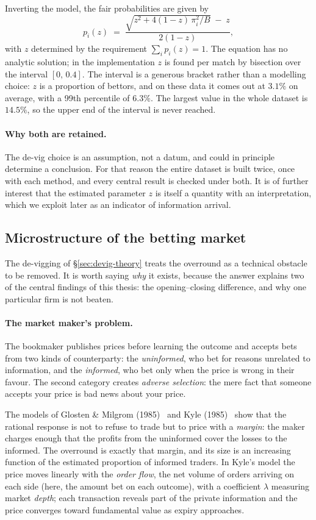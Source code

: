 \documentclass[12pt,a4paper,oneside]{report}
\renewcommand{\_}{\oldunderscore\allowbreak}
\theoremstyle{definition}
\theoremstyle{plain}
\theoremstyle{definition}   %
\begin{document}
Inverting the model, the fair probabilities are given by
\[
p_i(z) \;=\; \frac{\sqrt{z^2 + 4(1-z)\,\pi_i^2/B} \;-\; z}{2(1-z)},
\]
with $z$ determined by the requirement $\sum_i p_i(z) = 1$. The equation has no analytic
solution; in the implementation $z$ is found per match by bisection over the interval
$[0,\,0.4]$. The interval is a generous bracket rather than a modelling choice: $z$ is a
proportion of bettors, and on these data it comes out at $3.1\%$ on average, with a 99th percentile
of $6.3\%$. The largest value in the whole dataset is $14.5\%$, so the upper end of the interval
is never reached.

\paragraph{Why both are retained.} The de-vig choice is an assumption, not a datum, and could
in principle determine a conclusion. For that reason the entire dataset is built twice, once
with each method, and every central result is checked under both. It is of further interest
that the estimated parameter $z$ is itself a quantity with an interpretation, which we exploit
later as an indicator of information arrival.

\subsection{Microstructure of the betting market}
\label{sec:microstructure-theory}

The de-vigging of \S\ref{sec:devig-theory} treats the overround as a technical obstacle to be
removed. It is worth saying \emph{why} it exists, because the answer explains two of the
central findings of this thesis: the opening--closing difference, and why one particular firm
is not beaten.

\paragraph{The market maker's problem.} The bookmaker publishes prices before learning the
outcome and accepts bets from two kinds of counterparty: the \emph{uninformed}, who bet for
reasons unrelated to information, and the \emph{informed}, who bet only when the price is wrong
in their favour. The second category creates \emph{adverse selection}: the mere fact that
someone accepts your price is bad news about your price.

The models of Glosten \& Milgrom (1985)~\cite{glosten1985} and Kyle (1985)~\cite{kyle1985} show that the rational response is not
to refuse to trade but to price with a \emph{margin}: the maker charges enough that the profits
from the uninformed cover the losses to the informed. The overround is exactly that margin, and
its size is an increasing function of the estimated proportion of informed traders. In Kyle's
model the price moves linearly with the \emph{order flow}, the net volume of orders arriving on
each side (here, the amount bet on each outcome), with a coefficient $\lambda$ measuring market
\emph{depth}; each transaction reveals part of the private information and the price converges
toward fundamental value as expiry approaches.
\end{document}
